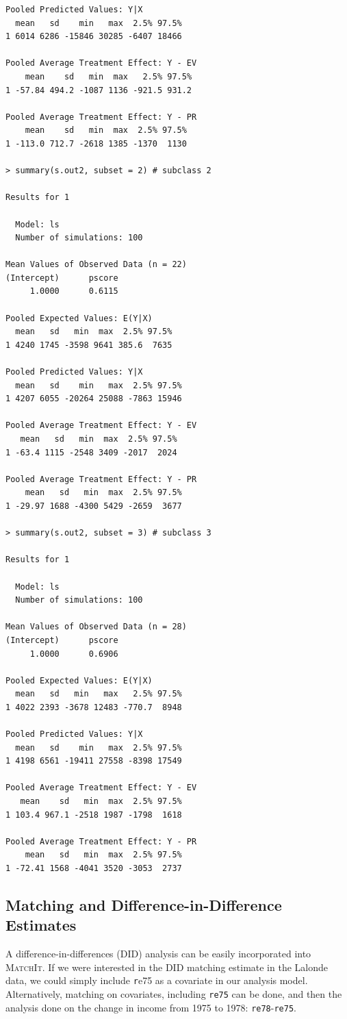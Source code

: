 \documentclass[oneside,letterpaper,titlepage]{article}
\newcommand{\MatchIt}{\textsc{MatchIt}}
\begin{document}
\begin{verbatim}
Pooled Predicted Values: Y|X
  mean   sd    min   max  2.5% 97.5%
1 6014 6286 -15846 30285 -6407 18466

Pooled Average Treatment Effect: Y - EV
    mean    sd   min  max   2.5% 97.5%
1 -57.84 494.2 -1087 1136 -921.5 931.2

Pooled Average Treatment Effect: Y - PR
    mean    sd   min  max  2.5% 97.5%
1 -113.0 712.7 -2618 1385 -1370  1130

> summary(s.out2, subset = 2) # subclass 2

Results for 1 

  Model: ls 
  Number of simulations: 100 

Mean Values of Observed Data (n = 22) 
(Intercept)      pscore 
     1.0000      0.6115 

Pooled Expected Values: E(Y|X)
  mean   sd   min  max  2.5% 97.5%
1 4240 1745 -3598 9641 385.6  7635

Pooled Predicted Values: Y|X
  mean   sd    min   max  2.5% 97.5%
1 4207 6055 -20264 25088 -7863 15946

Pooled Average Treatment Effect: Y - EV
   mean   sd   min  max  2.5% 97.5%
1 -63.4 1115 -2548 3409 -2017  2024

Pooled Average Treatment Effect: Y - PR
    mean   sd   min  max  2.5% 97.5%
1 -29.97 1688 -4300 5429 -2659  3677

> summary(s.out2, subset = 3) # subclass 3

Results for 1 

  Model: ls 
  Number of simulations: 100 

Mean Values of Observed Data (n = 28) 
(Intercept)      pscore 
     1.0000      0.6906 

Pooled Expected Values: E(Y|X)
  mean   sd   min   max   2.5% 97.5%
1 4022 2393 -3678 12483 -770.7  8948

Pooled Predicted Values: Y|X
  mean   sd    min   max  2.5% 97.5%
1 4198 6561 -19411 27558 -8398 17549

Pooled Average Treatment Effect: Y - EV
   mean    sd   min  max  2.5% 97.5%
1 103.4 967.1 -2518 1987 -1798  1618

Pooled Average Treatment Effect: Y - PR
    mean   sd   min  max  2.5% 97.5%
1 -72.41 1568 -4041 3520 -3053  2737

\end{verbatim}

\subsection{Matching and Difference-in-Difference Estimates}
A difference-in-differences (DID) analysis can be easily incorporated into
\MatchIt.  If we were interested in the DID matching estimate in the
Lalonde data, we could simply include {\texttt re75} as a covariate in
our analysis model.  Alternatively, matching on covariates, including {\tt re75} can be done, 
and then the analysis done on the change in income from 1975 to 1978: {\tt re78}-{\tt re75}.  
\end{document}
